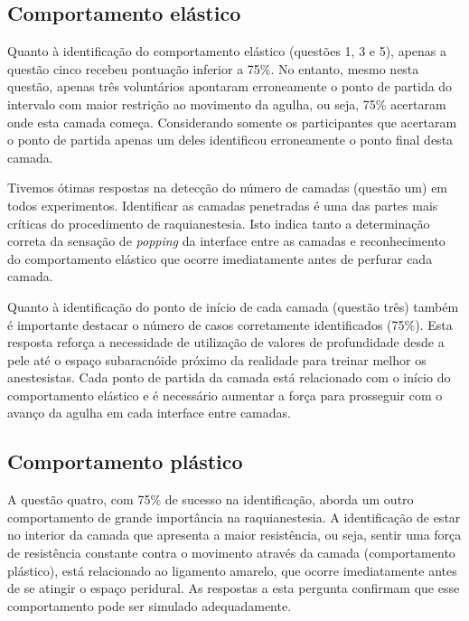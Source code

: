 \subsection{Comportamento elástico}

Quanto à identificação do comportamento elástico (questões 1, 3 e 5), apenas a questão cinco recebeu pontuação inferior a 75\%. No entanto, mesmo nesta questão, apenas três voluntários apontaram erroneamente o ponto de partida do intervalo com maior restrição ao movimento da agulha, ou seja, 75\% acertaram onde esta camada começa. Considerando somente os participantes que acertaram o ponto de partida apenas um deles identificou erroneamente o ponto final desta camada. 

Tivemos ótimas respostas na detecção do número de camadas (questão um) em todos experimentos. Identificar as camadas penetradas é uma das partes mais críticas do procedimento de raquianestesia. Isto indica tanto a determinação correta da sensação de \textit{popping} da interface entre as camadas e reconhecimento do comportamento elástico que ocorre imediatamente antes de perfurar cada camada.

Quanto à identificação do ponto de início de cada camada (questão três) também é importante destacar o número de casos corretamente identificados (75\%). Esta resposta reforça a necessidade de utilização de valores de profundidade desde a pele até o espaço subaracnóide próximo da realidade para treinar melhor os anestesistas. Cada ponto de partida da camada está relacionado com o início do comportamento elástico e é necessário aumentar a força para prosseguir com o avanço da agulha em cada interface entre camadas. 

\subsection{Comportamento plástico}

A questão quatro, com 75\% de sucesso na identificação, aborda um outro comportamento de grande importância na raquianestesia. A identificação de estar no interior da camada que apresenta a maior
resistência, ou seja, sentir uma força de resistência constante contra o movimento através da camada (comportamento plástico), está relacionado ao ligamento amarelo, que ocorre imediatamente antes de se atingir o espaço peridural. As respostas a esta pergunta
confirmam que esse comportamento pode ser simulado adequadamente.